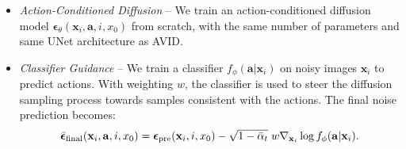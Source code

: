 \begin{itemize}[leftmargin=*, topsep=0pt]
    \setlength\itemsep{0.3mm}
    \item \textit{Action-Conditioned Diffusion} -- We train an action-conditioned diffusion model $\boldsymbol{\epsilon}_{\theta}(\mathbf{x}_i, \mathbf{a}, i, x_0)$  from scratch, with the same number of parameters and same UNet architecture as AVID.
    \item \textit{Classifier Guidance} \citep{dhariwal2021diffusion} -- We train a classifier $f_{\phi}(\mathbf{a} | \mathbf{x}_i)$ on noisy images $\mathbf{x}_i$ to predict actions. With weighting $w$, the classifier is used to steer the diffusion sampling process towards samples consistent with the actions. The final noise prediction becomes: 
    \begin{align*}
        \bar{\boldsymbol{\epsilon}}_{\textnormal{final}}(\mathbf{x}_i, \mathbf{a}, i, x_0) = \boldsymbol{\epsilon}_{\textnormal{pre}}(\mathbf{x}_i, i, x_0) - \sqrt{1 - \bar{\alpha}_t} \; w \nabla_{\mathbf{x}_i} \log f_\phi(\mathbf{a} \vert \mathbf{x}_i).
    \end{align*}


\end{itemize}
